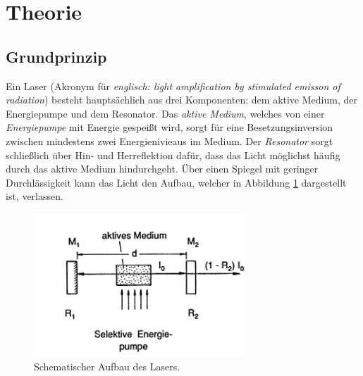 \section{Theorie}
\label{sec:Theorie}

\subsection{Grundprinzip}
Ein Laser (Akronym für \textit{englisch: light amplification by stimulated emisson of radiation}) besteht hauptsächlich aus drei Komponenten: dem aktive Medium, der Energiepumpe und dem Resonator.
Das \textit{aktive Medium}, welches von einer \textit{Energiepumpe} mit Energie gespeißt wird, sorgt für eine Besetzungsinversion zwischen mindestens zwei Energienivieaus im Medium. Der \textit{Resonator} sorgt schließlich über Hin- und Herreflektion dafür, dass das Licht möglichst häufig durch das aktive Medium hindurchgeht. Über einen Spiegel mit geringer Durchlässigkeit kann das Licht den Aufbau, welcher in Abbildung  \ref{fig:auf} dargestellt ist, verlassen.

\begin{figure}
    \centering
    \includegraphics[width=8cm]{Bilder/Aufbau.PNG}
    \caption{Schematischer Aufbau des Lasers.\cite{Laserspektroskopie_1}}
    \label{fig:auf}
\end{figure}


